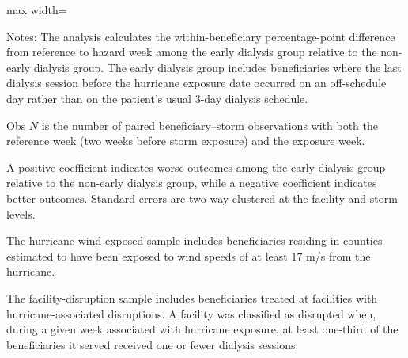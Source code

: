 \documentclass[11pt]{article}
\begin{document}
\begin{table}[!htbp]
\begin{adjustbox}{max width=\textwidth}
\begin{threeparttable}
\begin{tablenotes}[flushleft]
\footnotesize
Notes: The analysis calculates the within-beneficiary percentage-point difference from reference to hazard week among the early dialysis group relative to the non-early dialysis group. The early dialysis group includes beneficiaries where the last dialysis session before the hurricane exposure date occurred on an off-schedule day rather than on the patient’s usual 3-day dialysis schedule.
\item[a] Obs $N$ is the number of paired beneficiary--storm observations with both the reference week (two weeks before storm exposure) and the exposure week.
\item[b] A positive coefficient indicates worse outcomes among the early dialysis group relative to the non-early dialysis group, while a negative coefficient indicates better outcomes. Standard errors are two-way clustered at the facility and storm levels.
\item[c] The hurricane wind-exposed sample includes beneficiaries residing in counties estimated to have been exposed to wind speeds of at least 17 m/s from the hurricane.
\item[d] The facility-disruption sample includes beneficiaries treated at facilities with hurricane-associated disruptions. A facility was classified as disrupted when, during a given week associated with hurricane exposure, at least one-third of the beneficiaries it served received one or fewer dialysis sessions.
\end{tablenotes}

\end{threeparttable}
\end{adjustbox}

\end{table}
\end{document}
